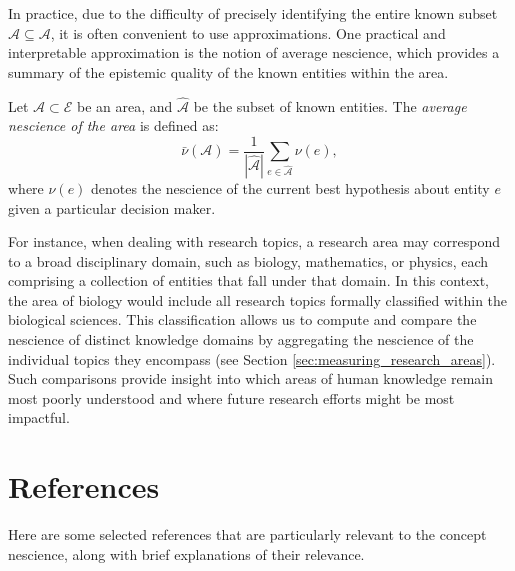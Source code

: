 In practice, due to the difficulty of precisely identifying the entire known subset $\hat{\mathcal{A}} \subseteq \mathcal{A}$, it is often convenient to use approximations. One practical and interpretable approximation is the notion of average nescience, which provides a summary of the epistemic quality of the known entities within the area.

\begin{definition}
Let $\mathcal{A} \subset \mathcal{E}$ be an area, and $\hat{\mathcal{A}}$ be the subset of known entities. The \emph{average nescience of the area} is defined as:
\[
\bar{\nu}(\mathcal{A}) = \frac{1}{|\hat{\mathcal{A}}|} \sum_{e \in \hat{\mathcal{A}}} \nu(e),
\]
where $\nu(e)$ denotes the nescience of the current best hypothesis about entity $e$ given a particular decision maker.
\end{definition}

For instance, when dealing with research topics, a research area may correspond to a broad disciplinary domain, such as biology, mathematics, or physics, each comprising a collection of entities that fall under that domain. In this context, the area of biology would include all research topics formally classified within the biological sciences. This classification allows us to compute and compare the nescience of distinct knowledge domains by aggregating the nescience of the individual topics they encompass (see Section \ref{sec:measuring_research_areas}). Such comparisons provide insight into which areas of human knowledge remain most poorly understood and where future research efforts might be most impactful.

%
%

\section*{References}

Here are some selected references that are particularly relevant to the concept nescience, along with brief explanations of their relevance.

